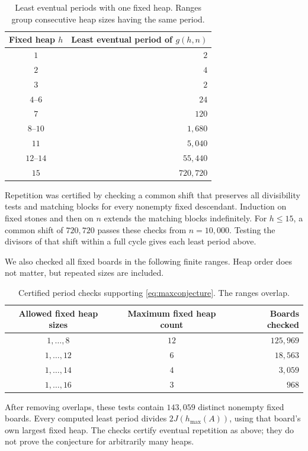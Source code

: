 \documentclass[11pt]{article}
\begin{document}
\begin{table}[H]
\centering
\begin{tabular}{@{}c r@{}}
\toprule
Fixed heap $h$ & Least eventual period of $g(h,n)$\\
\midrule
$1$ & $2$\\
$2$ & $4$\\
$3$ & $2$\\
$4$--$6$ & $24$\\
$7$ & $120$\\
$8$--$10$ & $1{,}680$\\
$11$ & $5{,}040$\\
$12$--$14$ & $55{,}440$\\
$15$ & $720{,}720$\\
\bottomrule
\end{tabular}
\caption{Least eventual periods with one fixed heap. Ranges group
consecutive heap sizes having the same period.}
\label{tab:singleperiods}
\end{table}

Repetition was certified by checking a common shift that preserves
all divisibility tests and matching blocks for every nonempty fixed
descendant. Induction on fixed stones and then on $n$ extends the
matching blocks indefinitely. For $h\le15$, a common shift of
$720{,}720$ passes these checks from $n=10{,}000$. Testing the divisors
of that shift within a full cycle gives each least period above.

We also checked all fixed boards in the following finite ranges.
Heap order does not matter, but repeated sizes are included.

\begin{table}[H]
\centering
\begin{tabular}{@{}c c r@{}}
\toprule
Allowed fixed heap sizes & Maximum fixed heap count & Boards checked \\
\midrule
$1,\ldots,8$ & $12$ & $125{,}969$ \\
$1,\ldots,12$ & $6$ & $18{,}563$ \\
$1,\ldots,14$ & $4$ & $3{,}059$ \\
$1,\ldots,16$ & $3$ & $968$ \\
\bottomrule
\end{tabular}
\caption{Certified period checks supporting
\eqref{eq:maxconjecture}. The ranges overlap.}
\label{tab:periodcoverage}
\end{table}

After removing overlaps, these tests contain $143{,}059$ distinct
nonempty fixed boards. Every computed least period divides
$2J(h_{\max}(A))$, using that board's own largest fixed heap.
The checks certify eventual repetition as above; they do not
prove the conjecture for arbitrarily many heaps.
\end{document}
